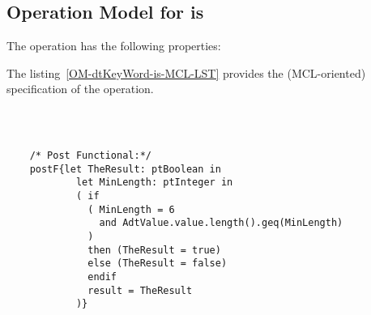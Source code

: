 \subsection{Operation Model for is}

\label{OM-is}


The  operation has the following properties:

	\begin{operationmodel}



		


	\end{operationmodel}



	\vspace{1cm}
	The listing~\ref{OM-dtKeyWord-is-MCL-LST} provides the \msrmessir (MCL-oriented) specification of the operation.
	
	\scriptsize
	\vspace{0.5cm}
	\begin{lstlisting}[style=MessirStyle,firstnumber=auto,captionpos=b,caption={\msrmessir (MCL-oriented) specification of the operation \emph{is}.},label=OM-dtKeyWord-is-MCL-LST]

	
	
	/* Post Functional:*/ 
	postF{let TheResult: ptBoolean in
	        let MinLength: ptInteger in
	        ( if
	          ( MinLength = 6
	            and AdtValue.value.length().geq(MinLength)
	          )
	          then (TheResult = true)
	          else (TheResult = false)
	          endif
	          result = TheResult
	        )}
	
	
	\end{lstlisting}
	\normalsize 
	
	
	
	





